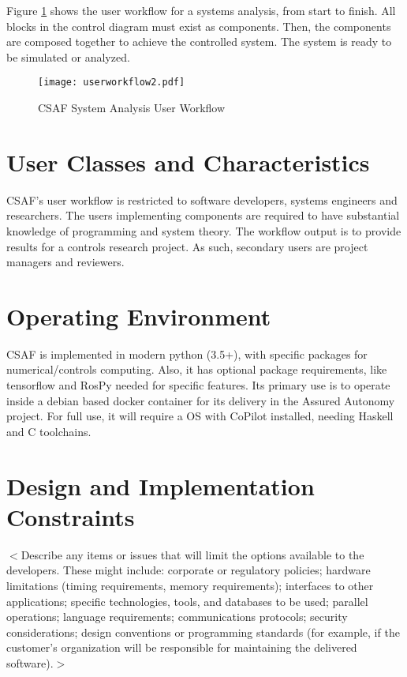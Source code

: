 Figure \ref{fig:uworkflow} shows the user workflow for a systems analysis, from start to finish. All blocks in the control diagram must exist as components. Then, the components are composed together to achieve the controlled system. The system is ready to be simulated or analyzed.

\begin{figure}
\centering
\texttt{[image: userworkflow2.pdf]}
\caption{ CSAF System Analysis User Workflow }
\label{fig:uworkflow}
\end{figure}

\section{User Classes and Characteristics}

CSAF's user workflow is restricted to software developers, systems engineers and researchers. The users implementing components are required to have substantial knowledge of programming and system theory. The workflow output is to provide results for a controls research project. As such, secondary users are project managers and reviewers. 


\section{Operating Environment}

CSAF is implemented in modern python (3.5+), with specific packages for numerical/controls computing. Also, it has optional package requirements, like tensorflow and RosPy needed for specific features. Its primary use is to operate inside a debian based docker container for its delivery in the Assured Autonomy project. For full use, it will require a OS with CoPilot installed, needing Haskell and C toolchains.  

\section{Design and Implementation Constraints}
$<$Describe any items or issues that will limit the options available to the 
developers. These might include: corporate or regulatory policies; hardware 
limitations (timing requirements, memory requirements); interfaces to other 
applications; specific technologies, tools, and databases to be used; parallel 
operations; language requirements; communications protocols; security 
considerations; design conventions or programming standards (for example, if the 
customer’s organization will be responsible for maintaining the delivered 
software).$>$


